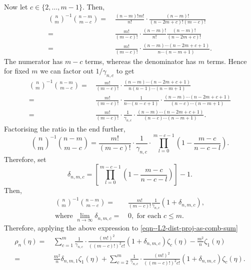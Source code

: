 \documentclass[12pt]{article}
\numberwithin{equation}{section}
\theoremstyle{definition}
\theoremstyle{plain}
\begin{document}
Now let \(c \in \{2, \dots, m - 1\}\).
Then,
\begin{align*}
  \binom{n}{m}^{- 1} \binom{n - m}{m - c} =
  & \, \frac{(n - m)! m!}{n!} \cdot \frac{(n - m)!}{(n - 2 m + c)! (m - c)!} \\
  =
  & \, \frac{m!}{(m - c)!} \cdot \frac{(n - m)!}{n!} \frac{(n - m)!}{(n - 2 m +
  c)!}
  \\
  =
  & \, \frac{m!}{(m - c)!} \cdot \frac{(n - m) \cdots (n - 2 m + c + 1)}{n
  \cdots (n - m + 1)}.
\end{align*}
The numerator has \(m - c\) terms, whereas the denominator has \(m\) terms.
Hence for fixed \(m\) we can factor out \(1 / \gamma_{n, c}\) to get
\begin{align*}
  \binom{n}{m}^{- 1} \binom{n - m}{m - c} =
  & \, \frac{m!}{(m - c)!} \cdot \frac{(n - m) \cdots (n - 2 m + c + 1)}{n
  (n - 1) \cdots (n - m + 1)} \\
  =
  & \, \frac{m!}{(m - c)!} \cdot \frac{1}{n \cdots (n - c + 1)} \cdot \frac{(n -
  m) \cdots (n - 2 m + c + 1)}{(n - c) \cdots (n - m + 1)} \\
  =
  & \, \frac{m!}{(m - c)!} \cdot \frac{1}{\gamma_{n, c}} \cdot \frac{(n - m)
  \cdots (n - 2 m + c + 1)}{(n - c) \cdots (n - m + 1)}.
\end{align*}
Factorising the ratio in the end further,
\begin{equation*}
  \binom{n}{m}^{- 1} \binom{n - m}{m - c} =
  \frac{m!}{(m - c)!} \cdot \frac{1}{\gamma_{n, c}} \cdot \prod_{l = 0}^{m - c -
  1} \left( 1 - \frac{m - c}{n - c - l}  \right).
\end{equation*}
Therefore, set
\begin{equation}
  \delta_{n, m, c} = \left[ \prod_{l = 0}^{m - c - 1} \left( 1 - \frac{m - c}{n
  - c - l} \right) \right] - 1.
  \label{eqn--delta-nmc}
\end{equation}
Then,
\begin{equation*}
  \begin{split}
    \binom{n}{m}^{- 1} \binom{n - m}{m - c} =
    & \, \frac{m!}{(m - c)!} \frac{1}{\gamma_{n, c}} \left( 1 + \delta_{n, m, c}
    \right), \\
    \text{where } \lim_{n \to \infty} \delta_{n, m, c} =
    & \, 0, \text{ for each } c
    \leq m.
  \end{split}
\end{equation*}
Therefore, applying the above expression to
\eqref{eqn--L2-dist-proj-as-comb-sum}
\begin{align}
  \rho_{n} (\eta) =
  & \, \sum_{c = 1}^{m} \frac{1}{\gamma_{n, c}} \cdot \frac{(m
  !)^{2}}{((m - c)!)^{2} c!} \left( 1 + \delta_{n, m, c} \right) \zeta_{c}
  (\eta) - \frac{m^{2}}{n} \zeta_{1} (\eta) \nonumber \\
  =
  & \, \frac{m^{2}}{n} \delta_{n, m, 1} \zeta_{1} (\eta) + \sum_{c = 2}^{m}
  \frac{1}{\gamma_{n, c}} \cdot \frac{(m !)^{2}}{((m - c)!)^{2} c!} \left( 1 +
  \delta_{n, m, c} \right) \zeta_{c} (\eta).
  \label{eqn--L2-dist-proj-m-1}
\end{align}
\end{document}
